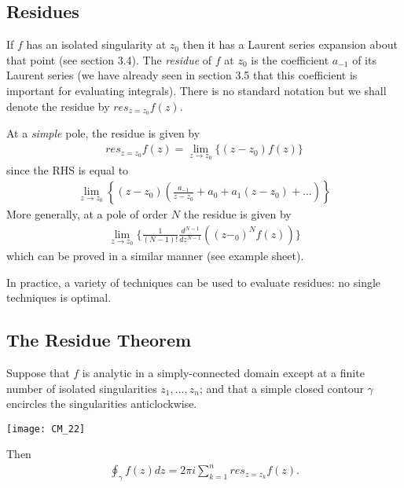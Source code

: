 \documentclass[a4paper]{article}
\begin{document}
\subsection{Residues}
If $f$ has an isolated singularity at $z_0$ then it has a Laurent series expansion about that point (see section 3.4). The \emph{residue} of $f$ at $z_0$ is the coefficient $a_{-1}$ of its Laurent series (we have already seen in section 3.5 that this coefficient is important for evaluating integrals). There is no standard notation but we shall denote the residue by $res_{z=z_0} f(z)$.

At a \emph{simple} pole, the residue is given by
\begin{equation*}
\begin{aligned}
res_{z = z_0} f(z) = \lim_{z \to z_0} \{(z-z_0) f(z)\}
\end{aligned}
\end{equation*}
since the RHS is equal to
\begin{equation*}
\begin{aligned}
\lim_{z \to z_0} \left\{(z-z_0)\left(\frac{a_{-1}}{z-z_0}+a_0+a_1(z-z_0)+...\right)\right\}
\end{aligned}
\end{equation*}
More generally, at a pole of order $N$ the residue is given by
\begin{equation*}
\begin{aligned}
\lim_{z \to z_0} \{\frac{1}{(N-1)!} \frac{d^{N-1}}{dz^{N-1}} ((z-_0)^N f(z)) \}
\end{aligned}
\end{equation*}
which can be proved in a similar manner (see example sheet).

In practice, a variety of techniques can be used to evaluate residues: no single techniques is optimal.

\subsection{The Residue Theorem}
Suppose that $f$ is analytic in a simply-connected domain except at a finite number of isolated singularities $z_1,...,z_n$; and that a simple closed contour $\gamma$ encircles the singularities anticlockwise. 

\texttt{[image: CM\_22]}

Then
\begin{equation*}
\begin{aligned}
\oint_\gamma f(z) dz = 2\pi i\sum_{k=1}^n res_{z=z_k} f(z).
\end{aligned}
\end{equation*}
\end{document}
